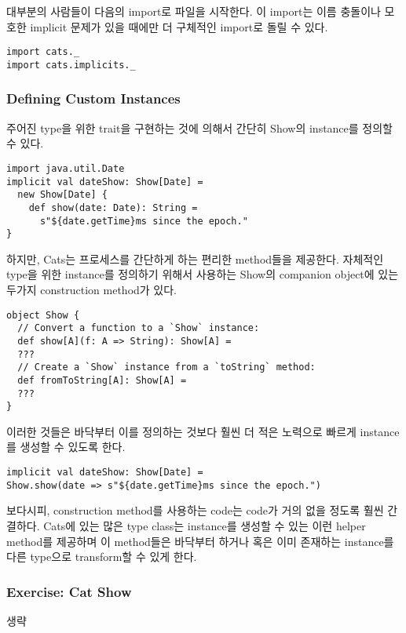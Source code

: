 \documentclass[a4paper]{article}
\begin{document}
대부분의 사람들이 다음의 import로 파일을 시작한다. 이 import는 이름 충돌이나 모호한 implicit 문제가 있을 때에만 더 구체적인 import로 돌릴 수 있다. 

\begin{verbatim}
import cats._
import cats.implicits._
\end{verbatim}

\subsubsection{Defining Custom Instances}
\label{sec:orgb220e8e}
주어진 type을 위한 trait을 구현하는 것에 의해서 간단히 Show의 instance를 정의할 수 있다.

\begin{verbatim}
import java.util.Date
implicit val dateShow: Show[Date] =
  new Show[Date] {
    def show(date: Date): String =
      s"${date.getTime}ms since the epoch."
}
\end{verbatim}

하지만, Cats는 프로세스를 간단하게 하는 편리한 method들을 제공한다. 자체적인 type을 위한 instance를 정의하기 위해서 사용하는 Show의 companion object에 있는 두가지 construction method가 있다. 

\begin{verbatim}
object Show {
  // Convert a function to a `Show` instance:
  def show[A](f: A => String): Show[A] =
  ???
  // Create a `Show` instance from a `toString` method:
  def fromToString[A]: Show[A] =
  ???
}
\end{verbatim}

이러한 것들은 바닥부터 이를 정의하는 것보다 훨씬 더 적은 노력으로 빠르게 instance를 생성할 수 있도록 한다.

\begin{verbatim}
implicit val dateShow: Show[Date] =
Show.show(date => s"${date.getTime}ms since the epoch.")
\end{verbatim}

보다시피, construction method를 사용하는 code는 code가 거의 없을 정도록 훨씬 간결하다. Cats에 있는 많은 type class는 instance를 생성할 수 있는 이런 helper method를 제공하며 이 method들은 바닥부터 하거나 혹은 이미 존재하는 instance를 다른 type으로 transform할 수 있게 한다.

\subsubsection{Exercise: Cat Show}
\label{sec:orgef3bb86}
생략
\end{document}

